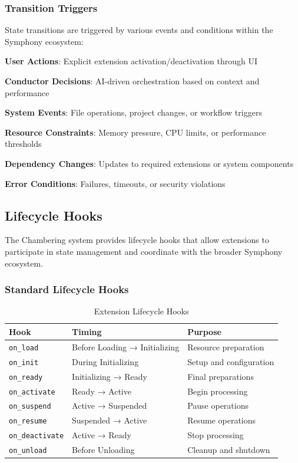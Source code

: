 \subsubsection{Transition Triggers}
\label{subsubsec:transition-triggers}

State transitions are triggered by various events and conditions within the Symphony ecosystem:

\begin{expandedlist}
\item \textbf{User Actions}: Explicit extension activation/deactivation through UI
\item \textbf{Conductor Decisions}: AI-driven orchestration based on context and performance
\item \textbf{System Events}: File operations, project changes, or workflow triggers
\item \textbf{Resource Constraints}: Memory pressure, CPU limits, or performance thresholds
\item \textbf{Dependency Changes}: Updates to required extensions or system components
\item \textbf{Error Conditions}: Failures, timeouts, or security violations
\end{expandedlist}

\subsection{Lifecycle Hooks}
\label{subsec:lifecycle-hooks}

The Chambering system provides lifecycle hooks that allow extensions to participate in state management and coordinate with the broader Symphony ecosystem.

\subsubsection{Standard Lifecycle Hooks}
\label{subsubsec:standard-lifecycle-hooks}

\begin{table}[h]
\centering
\caption{Extension Lifecycle Hooks}
\label{tab:lifecycle-hooks}
\begin{tabular}{@{}lll@{}}
\toprule
\textbf{Hook} & \textbf{Timing} & \textbf{Purpose} \\
\midrule
\texttt{on\_load} & Before Loading → Initializing & Resource preparation \\
\texttt{on\_init} & During Initializing & Setup and configuration \\
\texttt{on\_ready} & Initializing → Ready & Final preparations \\
\texttt{on\_activate} & Ready → Active & Begin processing \\
\texttt{on\_suspend} & Active → Suspended & Pause operations \\
\texttt{on\_resume} & Suspended → Active & Resume operations \\
\texttt{on\_deactivate} & Active → Ready & Stop processing \\
\texttt{on\_unload} & Before Unloading & Cleanup and shutdown \\
\bottomrule
\end{tabular}
\end{table}

